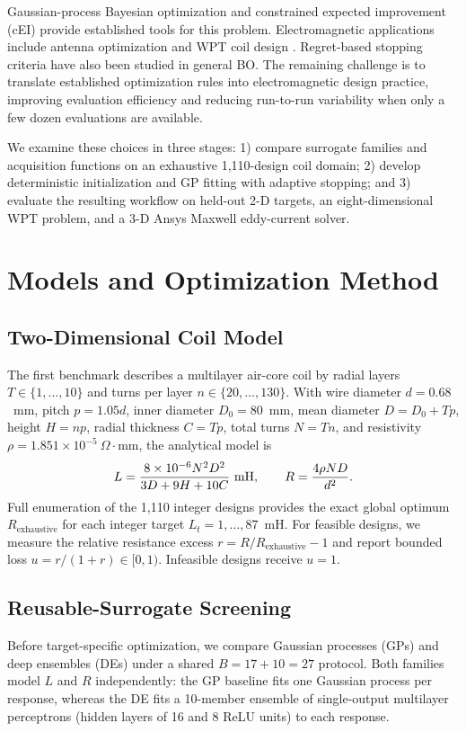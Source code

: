 \documentclass[10pt,conference,letterpaper]{IEEEtran}
\begin{document}
Gaussian-process Bayesian optimization and constrained expected improvement (cEI) \cite{gardner} provide established tools for this problem. Electromagnetic applications include antenna optimization \cite{liu2014,wu2024} and WPT coil design \cite{sim2023}. Regret-based stopping criteria \cite{ishibashi2023} have also been studied in general BO. The remaining challenge is to translate established optimization rules into electromagnetic design practice, improving evaluation efficiency and reducing run-to-run variability when only a few dozen evaluations are available.

We examine these choices in three stages: 1) compare surrogate families and acquisition functions on an exhaustive 1,110-design coil domain; 2) develop deterministic initialization and GP fitting with adaptive stopping; and 3) evaluate the resulting workflow on held-out 2-D targets, an eight-dimensional WPT problem, and a 3-D Ansys Maxwell eddy-current solver.

\section{Models and Optimization Method}
\subsection{Two-Dimensional Coil Model}
The first benchmark describes a multilayer air-core coil by radial layers $T\in\{1,\ldots,10\}$ and turns per layer $n\in\{20,\ldots,130\}$. With wire diameter $d=0.68$~mm, pitch $p=1.05d$, inner diameter $D_0=80$~mm, mean diameter $D=D_0+Tp$, height $H=np$, radial thickness $C=Tp$, total turns $N=Tn$, and resistivity $\rho=1.851\times10^{-5}~\Omega\!\cdot\!\mathrm{mm}$, the analytical model is
\begin{equation}
 L=\frac{8\times10^{-6}N^2D^2}{3D+9H+10C}\ {\rm mH},\qquad
 R=\frac{4\rho ND}{d^2}.
 \label{eq:coil}
\end{equation}
Full enumeration of the 1,110 integer designs provides the exact global optimum $R_{\text{exhaustive}}$ for each integer target $L_t=1,\ldots,87$~mH. For feasible designs, we measure the relative resistance excess $r=R/R_{\text{exhaustive}}-1$ and report bounded loss $u=r/(1+r)\in[0,1)$. Infeasible designs receive $u=1$.

\subsection{Reusable-Surrogate Screening}
Before target-specific optimization, we compare Gaussian processes (GPs) and deep ensembles (DEs) under a shared $B=17+10=27$ protocol. Both families model $L$ and $R$ independently: the GP baseline fits one Gaussian process per response, whereas the DE fits a 10-member ensemble of single-output multilayer perceptrons (hidden layers of 16 and 8 ReLU units) to each response.
\end{document}
